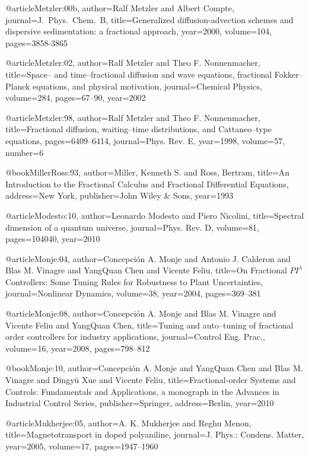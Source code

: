 \begin{thebibliography}{99}
@article{Metzler:00b,
  author={Ralf Metzler and Albert Compte},
  journal={J.\ Phys.\ Chem.\ B},
  title={Generalized diffusion-advection schemes and dispersive sedimentation:
    a fractional approach},
  year={2000},
  volume={104},
  pages={3858-3865}
}

@article{Metzler:02,
  author={Ralf Metzler and Theo F. Nonnenmacher},
  title={Space-- and time--fractional diffusion and wave equations, fractional
    {F}okker--{P}lanck equations, and physical motivation},
  journal={Chemical Physics},
  volume={284},
  pages={67--90},
  year={2002}
}

@article{Metzler:98,
  author={Ralf Metzler and Theo F. Nonnenmacher},
  title={Fractional diffusion, waiting--time distributions, and {C}attaneo--type
    equations},
  pages={6409--6414},
  journal={Phys. Rev. E},
  year={1998},
  volume={57},
  number={6}
}

@book{MillerRoss:93,
  author={Miller, Kenneth S. and Ross, Bertram},
  title={An Introduction to the Fractional Calculus and Fractional Differential
    Equations},
  address={New York},
  publisher={John Wiley {\&} Sons},
  year={1993}
}

@article{Modesto:10,
  author={Leonardo Modesto and Piero Nicolini},
  title={Spectral dimension of a quantum universe},
  journal={Phys. Rev. D},
  volume={81},
  pages={104040},
  year={2010}
}

@article{Monje:04,
  author={Concepci\'{o}n A. Monje and Antonio J. Calderon and Blas M. Vinagre and
    YangQuan Chen and Vicente Feliu},
  title={On Fractional {$PI^\lambda$} Controllers: Some Tuning Rules for Robustness
    to Plant Uncertainties},
  journal={Nonlinear Dynamics},
  volume={38},
  year={2004},
  pages={369--381}
}

@article{Monje:08,
  author={Concepci\'{o}n A. Monje and Blas M. Vinagre and Vicente Feliu and Yang{Q}uan
    Chen},
  title={Tuning and auto--tuning of fractional order controllers for industry applications},
  journal={Control Eng. Prac.},
  volume={16},
  year={2008},
  pages={798--812}
}

@book{Monje:10,
  author={Concepci{\'o}n A. Monje and YangQuan Chen and Blas M. Vinagre and Dingy\"{u}
    Xue and Vicente Feliu},
  title={Fractional-order Systems and Controls: Fundamentals and Applications,
    {\rm{a monograph in the}} Advances in Industrial Control \rm{Series}},
  publisher={Springer},
  address={Berlin},
  year={2010}
}

@article{Mukherjee:05,
  author={A. K. Mukherjee and Reghu Menon},
  title={Magnetotransport in doped polyaniline},
  journal={J. Phys.: Condens. Matter},
  year={2005},
  volume={17},
  pages={1947--1960}
}


\end{thebibliography}
